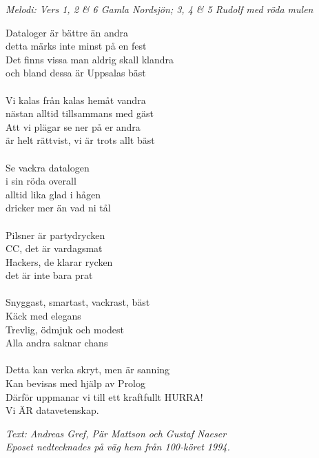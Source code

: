 {\footnotesize\textit{Melodi: Vers 1, 2 \& 6 Gamla Nordsjön; 3, 4 \& 5 Rudolf med röda mulen}}\par
\vspace{10pt}
Dataloger är bättre än andra\\
detta märks inte minst på en fest\\
Det finns vissa man aldrig skall klandra\\
och bland dessa är Uppsalas bäst\\
\\
Vi kalas från kalas hemåt vandra\\
nästan alltid tillsammans med gäst\\
Att vi plägar se ner på er andra\\
är helt rättvist, vi är trots allt bäst\\
\\
Se vackra datalogen\\
i sin röda overall\\
alltid lika glad i hågen\\
dricker mer än vad ni tål\\
\\
Pilsner är partydrycken\\
CC, det är vardagsmat\\
Hackers, de klarar rycken\\
det är inte bara prat\\
\\
Snyggast, smartast, vackrast, bäst\\
Käck med elegans\\
Trevlig, ödmjuk och modest\\
Alla andra saknar chans\\
\\
Detta kan verka skryt, men är sanning\\
Kan bevisas med hjälp av Prolog\\
Därför uppmanar vi till ett kraftfullt HURRA!\\
Vi ÄR datavetenskap.
\par
\vspace{10pt}
{\footnotesize\textit{Text: Andreas Gref, Pär Mattson och Gustaf Naeser\\
Eposet nedtecknades på väg hem från 100-köret 1994.}}
